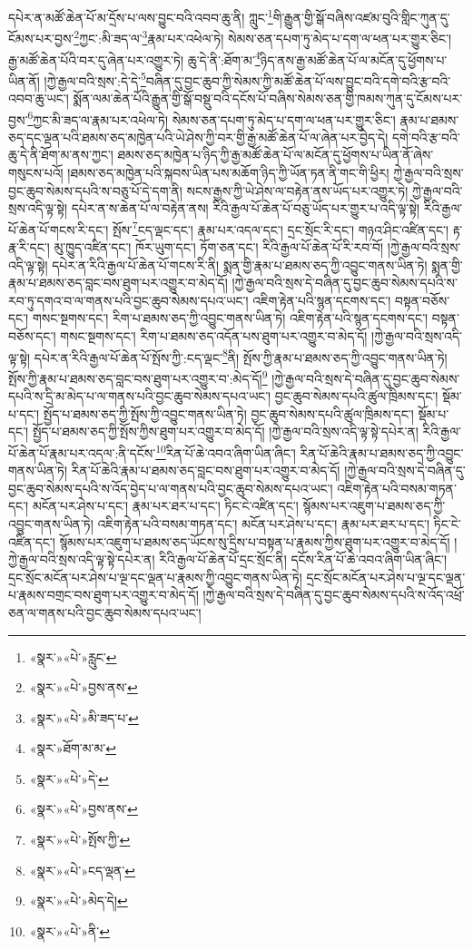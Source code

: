 དཔེར་ན་མཚོ་ཆེན་པོ་མ་དྲོས་པ་ལས་བྱུང་བའི་འབབ་ཆུ་ནི། ཀླུང་\footnote{«སྣར་»«པེ་»རླུང་}གི་རྒྱུན་གྱི་སྒོ་བཞིས་འཛམ་བུའི་གླིང་ཀུན་དུ་ངོམས་པར་བྱས་\footnote{«སྣར་»«པེ་»བྱས་ནས་}ཀྱང་:མི་ཟད་ལ་\footnote{«སྣར་»«པེ་»མི་ཟད་པ་}རྣམ་པར་འཕེལ་ཏེ། སེམས་ཅན་དཔག་ཏུ་མེད་པ་དག་ལ་ཕན་པར་གྱུར་ཅིང་། རྒྱ་མཚོ་ཆེན་པོའི་བར་དུ་ཞེན་པར་འགྱུར་ཏེ། ཆུ་དེ་ནི་:ཐོག་མ་\footnote{«སྣར་»ཐོག་མ་མ་}ཉིད་ནས་རྒྱ་མཚོ་ཆེན་པོ་ལ་མངོན་དུ་ཕྱོགས་པ་ཡིན་ནོ། །ཀྱེ་རྒྱལ་བའི་སྲས་:དེ་དེ་\footnote{«སྣར་»«པེ་»དེ་}བཞིན་དུ་བྱང་ཆུབ་ཀྱི་སེམས་ཀྱི་མཚོ་ཆེན་པོ་ལས་བྱུང་བའི་དགེ་བའི་རྩ་བའི་འབབ་ཆུ་ཡང་། སྨོན་ལམ་ཆེན་པོའི་རྒྱུན་གྱི་སྒོ་བསྡུ་བའི་དངོས་པོ་བཞིས་སེམས་ཅན་གྱི་ཁམས་ཀུན་དུ་ངོམས་པར་བྱས་\footnote{«སྣར་»«པེ་»བྱས་ནས་}ཀྱང་མི་ཟད་ལ་རྣམ་པར་འཕེལ་ཏེ། སེམས་ཅན་དཔག་ཏུ་མེད་པ་དག་ལ་ཕན་པར་གྱུར་ཅིང་། རྣམ་པ་ཐམས་ཅད་དང་ལྡན་པའི་ཐམས་ཅད་མཁྱེན་པའི་ཡེ་ཤེས་ཀྱི་བར་གྱི་རྒྱ་མཚོ་ཆེན་པོ་ལ་ཞེན་པར་བྱེད་དེ། དགེ་བའི་རྩ་བའི་ཆུ་དེ་ནི་ཐོག་མ་ནས་ཀྱང་། ཐམས་ཅད་མཁྱེན་པ་ཉིད་ཀྱི་རྒྱ་མཚོ་ཆེན་པོ་ལ་མངོན་དུ་ཕྱོགས་པ་ཡིན་ནོ་ཞེས་གསུངས་པའོ། །ཐམས་ཅད་མཁྱེན་པའི་སྐབས་ཡིན་པས་མཆོག་ཉིད་ཀྱི་ཡོན་ཏན་ནི་གང་གི་ཕྱིར། ཀྱེ་རྒྱལ་བའི་སྲས་བྱང་ཆུབ་སེམས་དཔའི་ས་བཅུ་པོ་དེ་དག་ནི། སངས་རྒྱས་ཀྱི་ཡེ་ཤེས་ལ་བརྟེན་ནས་ཡོད་པར་འགྱུར་ཏེ། ཀྱེ་རྒྱལ་བའི་སྲས་འདི་ལྟ་སྟེ། དཔེར་ན་ས་ཆེན་པོ་ལ་བརྟེན་ནས། རིའི་རྒྱལ་པོ་ཆེན་པོ་བཅུ་ཡོད་པར་གྱུར་པ་འདི་ལྟ་སྟེ། རིའི་རྒྱལ་པོ་ཆེན་པོ་གངས་རི་དང་། སྤོས་\footnote{«སྣར་»«པེ་»སྤོས་ཀྱི་}ངད་ལྡང་དང་། རྣམ་པར་འདལ་དང་། དྲང་སྲོང་རི་དང་། གཉའ་ཤིང་འཛིན་དང་། རྟ་རྣ་རི་དང་། མུ་ཁྱུད་འཛིན་དང་། ཁོར་ཡུག་དང་། ཏོག་ཅན་དང་། རིའི་རྒྱལ་པོ་ཆེན་པོ་རི་རབ་བོ། །ཀྱེ་རྒྱལ་བའི་སྲས་འདི་ལྟ་སྟེ། དཔེར་ན་རིའི་རྒྱལ་པོ་ཆེན་པོ་གངས་རི་ནི། སྨན་གྱི་རྣམ་པ་ཐམས་ཅད་ཀྱི་འབྱུང་གནས་ཡིན་ཏེ། སྨན་གྱི་རྣམ་པ་ཐམས་ཅད་བླང་བས་ཐུག་པར་འགྱུར་བ་མེད་དོ། །ཀྱེ་རྒྱལ་བའི་སྲས་དེ་བཞིན་དུ་བྱང་ཆུབ་སེམས་དཔའི་ས་རབ་ཏུ་དགའ་བ་ལ་གནས་པའི་བྱང་ཆུབ་སེམས་དཔའ་ཡང་། འཇིག་རྟེན་པའི་སྙན་དངགས་དང་། བསྟན་བཅོས་དང་། གསང་སྔགས་དང་། རིག་པ་ཐམས་ཅད་ཀྱི་འབྱུང་གནས་ཡིན་ཏེ། འཇིག་རྟེན་པའི་སྙན་དངགས་དང་། བསྟན་བཅོས་དང་། གསང་སྔགས་དང་། རིག་པ་ཐམས་ཅད་འདོན་པས་ཐུག་པར་འགྱུར་བ་མེད་དོ། །ཀྱེ་རྒྱལ་བའི་སྲས་འདི་ལྟ་སྟེ། དཔེར་ན་རིའི་རྒྱལ་པོ་ཆེན་པོ་སྤོས་ཀྱི་:ངད་ལྡང་\footnote{«སྣར་»«པེ་»ངད་ལྡན་}ནི། སྤོས་ཀྱི་རྣམ་པ་ཐམས་ཅད་ཀྱི་འབྱུང་གནས་ཡིན་ཏེ། སྤོས་ཀྱི་རྣམ་པ་ཐམས་ཅད་བླང་བས་ཐུག་པར་འགྱུར་བ་:མེད་དོ།\footnote{«སྣར་»«པེ་»མེད་དེ།} །ཀྱེ་རྒྱལ་བའི་སྲས་དེ་བཞིན་དུ་བྱང་ཆུབ་སེམས་དཔའི་ས་དྲི་མ་མེད་པ་ལ་གནས་པའི་བྱང་ཆུབ་སེམས་དཔའ་ཡང་། བྱང་ཆུབ་སེམས་དཔའི་ཚུལ་ཁྲིམས་དང་། སྡོམ་པ་དང་། སྤྱོད་པ་ཐམས་ཅད་ཀྱི་སྤོས་ཀྱི་འབྱུང་གནས་ཡིན་ཏེ། བྱང་ཆུབ་སེམས་དཔའི་ཚུལ་ཁྲིམས་དང་། སྡོམ་པ་དང་། སྤྱོད་པ་ཐམས་ཅད་ཀྱི་སྤོས་ཀྱིས་ཐུག་པར་འགྱུར་བ་མེད་དོ། །ཀྱེ་རྒྱལ་བའི་སྲས་འདི་ལྟ་སྟེ་དཔེར་ན། རིའི་རྒྱལ་པོ་ཆེན་པོ་རྣམ་པར་འདལ་:ནི་དངོས་\footnote{«སྣར་»«པེ་»ནི་}རིན་པོ་ཆེ་འབའ་ཞིག་ཡིན་ཞིང་། རིན་པོ་ཆེའི་རྣམ་པ་ཐམས་ཅད་ཀྱི་འབྱུང་གནས་ཡིན་ཏེ། རིན་པོ་ཆེའི་རྣམ་པ་ཐམས་ཅད་བླང་བས་ཐུག་པར་འགྱུར་བ་མེད་དོ། །ཀྱེ་རྒྱལ་བའི་སྲས་དེ་བཞིན་དུ་བྱང་ཆུབ་སེམས་དཔའི་ས་འོད་བྱེད་པ་ལ་གནས་པའི་བྱང་ཆུབ་སེམས་དཔའ་ཡང་། འཇིག་རྟེན་པའི་བསམ་གཏན་དང་། མངོན་པར་ཤེས་པ་དང་། རྣམ་པར་ཐར་པ་དང་། ཏིང་ངེ་འཛིན་དང་། སྙོམས་པར་འཇུག་པ་ཐམས་ཅད་ཀྱི་འབྱུང་གནས་ཡིན་ཏེ། འཇིག་རྟེན་པའི་བསམ་གཏན་དང་། མངོན་པར་ཤེས་པ་དང་། རྣམ་པར་ཐར་པ་དང་། ཏིང་ངེ་འཛིན་དང་། སྙོམས་པར་འཇུག་པ་ཐམས་ཅད་ཡོངས་སུ་དྲིས་པ་བསྟན་པ་རྣམས་ཀྱིས་ཐུག་པར་འགྱུར་བ་མེད་དོ། །ཀྱེ་རྒྱལ་བའི་སྲས་འདི་ལྟ་སྟེ་དཔེར་ན། རིའི་རྒྱལ་པོ་ཆེན་པོ་དྲང་སྲོང་ནི། དངོས་རིན་པོ་ཆེ་འབའ་ཞིག་ཡིན་ཞིང་། དྲང་སྲོང་མངོན་པར་ཤེས་པ་ལྔ་དང་ལྡན་པ་རྣམས་ཀྱི་འབྱུང་གནས་ཡིན་ཏེ། དྲང་སྲོང་མངོན་པར་ཤེས་པ་ལྔ་དང་ལྡན་པ་རྣམས་བགྲང་བས་ཐུག་པར་འགྱུར་བ་མེད་དོ། །ཀྱེ་རྒྱལ་བའི་སྲས་དེ་བཞིན་དུ་བྱང་ཆུབ་སེམས་དཔའི་ས་འོད་འཕྲོ་ཅན་ལ་གནས་པའི་བྱང་ཆུབ་སེམས་དཔའ་ཡང་། 